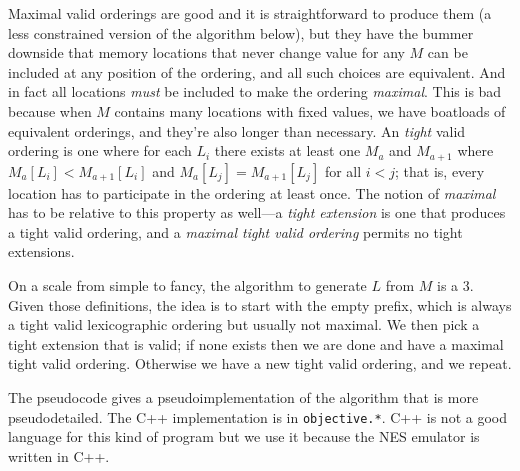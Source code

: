 \documentclass[twocolumn]{article}
\begin{document}
Maximal valid orderings are good and it is straightforward to produce
them (a less constrained version of the algorithm below), but they
have the bummer downside that memory locations that never change value
for any $M$ can be included at any position of the ordering, and all
such choices are equivalent. And in fact all locations {\em must} be
included to make the ordering {\em maximal}. This is bad because when
$M$ contains many locations with fixed values, we have boatloads of
equivalent orderings, and they're also longer than necessary. An {\em
  tight} valid ordering is one where for each $L_i$ there exists at
least one $M_a$ and $M_{a+1}$ where $M_a[L_i] < M_{a+1}[L_i]$ and
$M_a[L_j] = M_{a+1}[L_j]$ for all $i < j$; that is, every location has
to participate in the ordering at least once. The notion of {\em
  maximal} has to be relative to this property as well---a {\em tight
  extension} is one that produces a tight valid ordering, and a {\em
  maximal tight valid ordering} permits no tight extensions.

On a scale from simple to fancy, the algorithm to generate $L$ from
$M$ is a 3. Given those definitions, the idea is to start with the
empty prefix, which is always a tight valid lexicographic ordering but
usually not maximal. We then pick a tight extension that is valid; if
none exists then we are done and have a maximal tight valid ordering.
Otherwise we have a new tight valid ordering, and we repeat.

The pseudocode gives a pseudoimplementation of the algorithm that is
more pseudodetailed. The C++ implementation is in \verb+objective.*+.
C++ is not a good language for this kind of program but we use it
because the NES emulator is written in C++.
\end{document}
